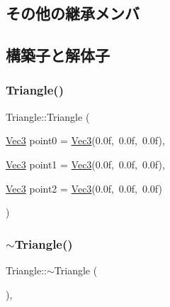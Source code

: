 \subsection*{その他の継承メンバ}


\subsection{構築子と解体子}
\mbox{\label{class_triangle_a2d96bc16d87b0ece2fef7325d63969b3}} 
\subsubsection{\texorpdfstring{Triangle()}{Triangle()}}
{\footnotesize\ttfamily Triangle\+::\+Triangle (\begin{DoxyParamCaption}\item[{\mbox{\hyperlink{_vector3_d_8h_ab16f59e4393f29a01ec8b9bbbabbe65d}{Vec3}}}]{point0 = {\ttfamily \mbox{\hyperlink{_vector3_d_8h_ab16f59e4393f29a01ec8b9bbbabbe65d}{Vec3}}(0.0f,~0.0f,~0.0f)},  }\item[{\mbox{\hyperlink{_vector3_d_8h_ab16f59e4393f29a01ec8b9bbbabbe65d}{Vec3}}}]{point1 = {\ttfamily \mbox{\hyperlink{_vector3_d_8h_ab16f59e4393f29a01ec8b9bbbabbe65d}{Vec3}}(0.0f,~0.0f,~0.0f)},  }\item[{\mbox{\hyperlink{_vector3_d_8h_ab16f59e4393f29a01ec8b9bbbabbe65d}{Vec3}}}]{point2 = {\ttfamily \mbox{\hyperlink{_vector3_d_8h_ab16f59e4393f29a01ec8b9bbbabbe65d}{Vec3}}(0.0f,~0.0f,~0.0f)} }\end{DoxyParamCaption})\hspace{0.3cm}{\ttfamily [inline]}}

\mbox{\label{class_triangle_a5199760a17454f4dc94c855a57e3a152}} 
\subsubsection{\texorpdfstring{$\sim$\+Triangle()}{~Triangle()}}
{\footnotesize\ttfamily Triangle\+::$\sim$\+Triangle (\begin{DoxyParamCaption}{ }\end{DoxyParamCaption})\hspace{0.3cm}{\ttfamily [inline]}, {\ttfamily [virtual]}}



